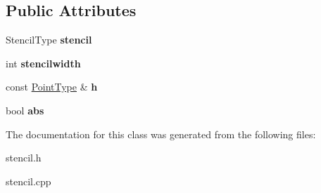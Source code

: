 \subsection*{Public Attributes}
\begin{DoxyCompactItemize}
\item 
\hypertarget{class_stencil_a73fd87ad5880d4a3a4cecc63712a0642}{Stencil\-Type {\bfseries stencil}}\label{class_stencil_a73fd87ad5880d4a3a4cecc63712a0642}

\item 
\hypertarget{class_stencil_a8543574d7ac8d3571ba703aad105c1b8}{int {\bfseries stencilwidth}}\label{class_stencil_a8543574d7ac8d3571ba703aad105c1b8}

\item 
\hypertarget{class_stencil_a21b81119e8854c9122e0c44fb74ef296}{const \hyperlink{class_array}{Point\-Type} \& {\bfseries h}}\label{class_stencil_a21b81119e8854c9122e0c44fb74ef296}

\item 
\hypertarget{class_stencil_a155abc662ac1cfe4b7b8bdd919297dbc}{bool {\bfseries abs}}\label{class_stencil_a155abc662ac1cfe4b7b8bdd919297dbc}

\end{DoxyCompactItemize}


The documentation for this class was generated from the following files\-:\begin{DoxyCompactItemize}
\item 
stencil.\-h\item 
stencil.\-cpp\end{DoxyCompactItemize}
